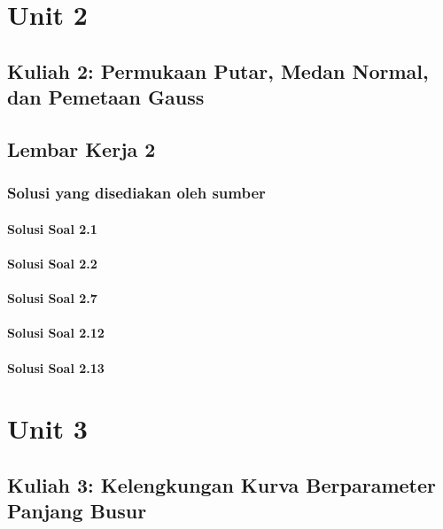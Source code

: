 \documentclass[11pt,a4paper,oneside]{book}
\begin{document}
\part{Unit 2}
\chapter[Kuliah 2]{Kuliah 2: Permukaan Putar, Medan Normal, dan Pemetaan Gauss}


\chapter{Lembar Kerja 2}


\section*{Solusi yang disediakan oleh sumber}
\subsection*{Solusi Soal 2.1}

\subsection*{Solusi Soal 2.2}

\subsection*{Solusi Soal 2.7}
\begingroup\scriptsize

\endgroup
\subsection*{Solusi Soal 2.12}
\begingroup\small

\endgroup
\subsection*{Solusi Soal 2.13}


\part{Unit 3}
\chapter[Kuliah 3]{Kuliah 3: Kelengkungan Kurva Berparameter Panjang Busur}

\end{document}
